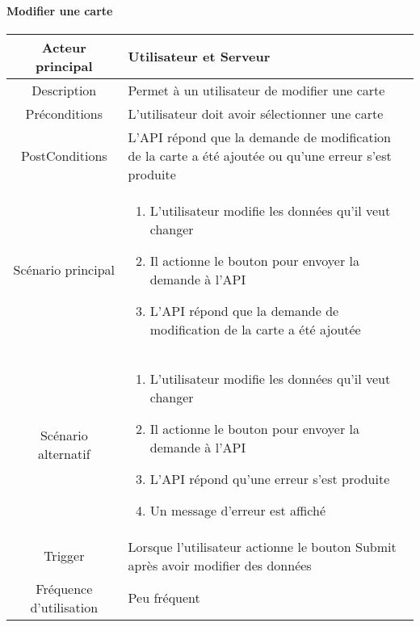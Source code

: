 \documentclass{article}
\begin{document}
\paragraph{Modifier une carte}
    \begin{table}[h]
        \begin{tabular}{|c|p{10cm}|}
        \hline
        Acteur principal& Utilisateur et Serveur    \\
        \hline
        Description&  Permet à un utilisateur de modifier une carte  \\
        \hline
        Préconditions&    L'utilisateur doit avoir sélectionner une carte  \\
        \hline
        PostConditions&  L'API répond que la demande de modification de la carte a été ajoutée ou qu'une erreur s'est produite    \\
        \hline
        Scénario principal& 
                \begin{enumerate}
                    \item L'utilisateur modifie les données qu'il veut changer
                    \item Il actionne le bouton pour envoyer la demande à l'API
                    \item L'API répond que la demande de modification de la carte a été ajoutée
                \end{enumerate}     \\
        \hline
        Scénario alternatif&  
        \begin{enumerate}
            \item L'utilisateur modifie les données qu'il veut changer
            \item Il actionne le bouton pour envoyer la demande à l'API
            \item L'API répond qu'une erreur s'est produite
            \item Un message d'erreur est affiché
        \end{enumerate}    \\
        \hline
        Trigger&   Lorsque l'utilisateur actionne le bouton Submit après avoir modifier des données   \\
        \hline
        Fréquence d'utilisation&    Peu fréquent  \\
        \hline
        \end{tabular}
    \end{table}

\newpage
\end{document}
